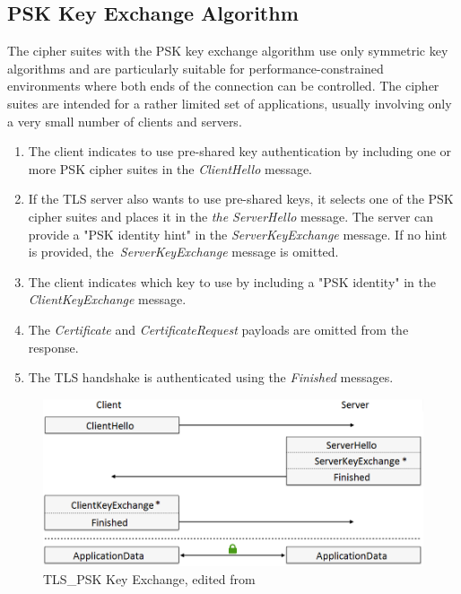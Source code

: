 \documentclass[
  twoside, 12pt, 
  printed, %
  notable,   %
  lof,     %
  lot,     %
]{fithesis3}
\begin{document}
\subsection{PSK Key Exchange Algorithm}\label{pskAlgorithm}
The cipher suites with the PSK key exchange algorithm use only symmetric key algorithms and 
are particularly suitable for performance-constrained environments where both ends of the 
connection can be controlled. The cipher suites are intended for a rather limited set of 
applications, usually involving only a very small number of clients and servers.

\begin{enumerate}
\item The client indicates to use pre-shared key authentication by including one or more PSK cipher suites in the \textit{ClientHello} message. 
\item If the TLS server also wants to use pre-shared keys, it selects one of the PSK cipher suites and places it in the \textit{the ServerHello} message. The server can provide a "PSK identity hint" in the \textit{ServerKeyExchange} message. If no hint is provided, the~\textit{ServerKeyExchange} message is omitted.
\item The client indicates which key to use by including a "PSK identity" in the \textit{ClientKeyExchange} message.
\item The \textit{Certificate} and \textit{CertificateRequest} payloads are omitted from the response.
\item The TLS handshake is authenticated using the \textit{Finished} messages. 
\end{enumerate}

\begin{figure}[th]
	\centering
  	\includegraphics[width=1.05\textwidth]{psk-edited}%
   \caption{TLS\_PSK Key Exchange, edited from \cite{taubert}}
\end{figure}
\end{document}
